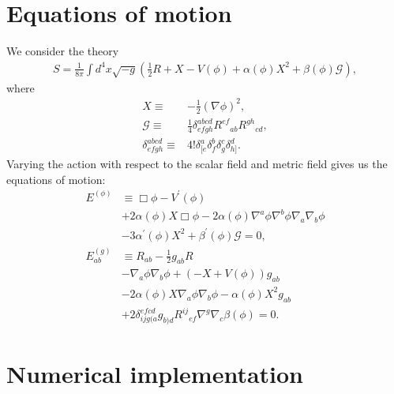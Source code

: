 \documentclass[a4paper,11pt]{article}
\begin{document}
\section{Equations of motion}
   We consider the theory
\begin{align}
   S
   =
   \frac{1}{8\pi}\int d^4x\sqrt{-g}\left(
      \frac{1}{2}R
   +  X
   -  V(\phi)
   +  \alpha(\phi)X^2
   +  \beta(\phi)\mathcal{G}
   \right)
   ,
\end{align}
   where
\begin{subequations}
\begin{align}
   X
   \equiv&
-  \frac{1}{2}\left(\nabla\phi\right)^2
   ,\\
   \mathcal{G}
   \equiv&
   \frac{1}{4}\delta^{abcd}_{efgh}
   R^{ef}{}_{ab}R^{gh}{}_{cd}
   ,\\
   \delta^{abcd}_{efgh}
   \equiv&
   4!\delta^a_{[e}\delta^b_f\delta^c_g\delta^d_{h]}
   .
\end{align}
\end{subequations}
   Varying the action with respect to the scalar field and metric field
gives us the equations of motion:
\begin{align}
\label{eq:eom_edgb_scalar}
   E^{(\phi)}
   &\equiv
      \Box\phi
   -  V^{\prime}\left(\phi\right)
   \nonumber\\&
   +  2\alpha\left(\phi\right)X \Box\phi
   -  2\alpha\left(\phi\right)\nabla^a\phi\nabla^b\phi\nabla_a\nabla_b\phi
   \nonumber\\&
   -  3\alpha^{\prime}\left(\phi\right)X^2
   +  \beta^{\prime}\left(\phi\right)\mathcal{G}
   =
   0
   ,\\
\label{eq:eom_edgb_tensor}
   E^{(g)}_{ab}
   &\equiv
   R_{ab}
-  \frac{1}{2}g_{ab}R
   \nonumber\\&
-  \nabla_a\phi\nabla_b\phi
+  \left(-X+V\left(\phi\right)\right)g_{ab}
   \nonumber\\&
-  2\alpha\left(\phi\right)X\nabla_a\phi\nabla_b\phi
-  \alpha\left(\phi\right)X^2g_{ab}
   \nonumber\\&
+  2\delta^{efcd}_{ijg(a}g_{b)d}R^{ij}{}_{ef}
   \nabla^g\nabla_c\beta\left(\phi\right) 
   =
   0
   .
\end{align}
\section{Numerical implementation}
\end{document}
